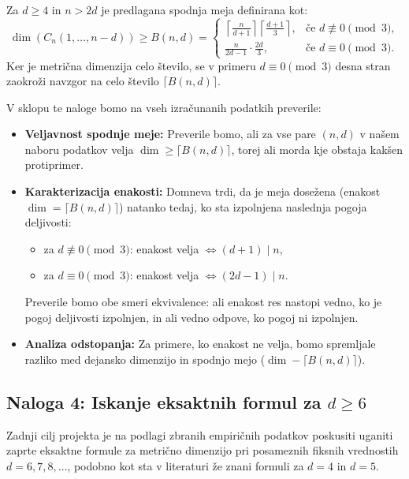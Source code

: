 \documentclass[a4paper,12pt]{article}
\theoremstyle{definition}
\begin{document}
Za $d \geq 4$ in $n > 2d$ je predlagana spodnja meja definirana kot:
\[
\operatorname{dim}(C_n(1, \dots, n-d)) \geq B(n, d) = 
\begin{cases}
\left\lceil \frac{n}{d+1} \right\rceil \left\lceil \frac{d+1}{3} \right\rceil, & \text{če } d \not\equiv 0 \pmod 3, \\[1.5ex]
\frac{n}{2d-1} \cdot \frac{2d}{3}, & \text{če } d \equiv 0 \pmod 3.
\end{cases}
\]
Ker je metrična dimenzija celo število, se v primeru $d \equiv 0 \pmod 3$ desna stran zaokroži navzgor na celo število $\lceil B(n, d) \rceil$.

V sklopu te naloge bomo na vseh izračunanih podatkih  preverile:
\begin{itemize}
    \item \textbf{Veljavnost spodnje meje:} Preverile bomo, ali za vse pare $(n, d)$ v našem naboru podatkov velja $\operatorname{dim} \geq \lceil B(n, d) \rceil$, torej ali morda kje obstaja kakšen protiprimer.
    \item \textbf{Karakterizacija enakosti:} Domneva trdi, da je meja dosežena (enakost $\operatorname{dim} = \lceil B(n, d) \rceil$) natanko tedaj, ko sta izpolnjena naslednja pogoja deljivosti:
    \begin{itemize}
        \item za $d \not\equiv 0 \pmod 3$: enakost velja $\iff (d+1) \mid n$,
        \item za $d \equiv 0 \pmod 3$: enakost velja $\iff (2d-1) \mid n$.
    \end{itemize}
    Preverile bomo obe smeri ekvivalence: ali enakost res nastopi vedno, ko je pogoj deljivosti izpolnjen, in ali 
    vedno odpove, ko pogoj ni izpolnjen.
    \item \textbf{Analiza odstopanja:} Za primere, ko enakost ne velja, bomo spremljale razliko med dejansko dimenzijo 
    in spodnjo mejo ($\operatorname{dim} - \lceil B(n, d) \rceil$).
\end{itemize}

\subsection{Naloga 4: Iskanje eksaktnih formul za $d \geq 6$}

Zadnji cilj projekta je na podlagi zbranih empiričnih podatkov poskusiti uganiti zaprte eksaktne formule za metrično 
dimenzijo pri posameznih fiksnih vrednostih $d = 6, 7, 8, \dots$, podobno kot sta v literaturi že znani formuli za 
$d = 4$ in $d = 5$.
\end{document}
